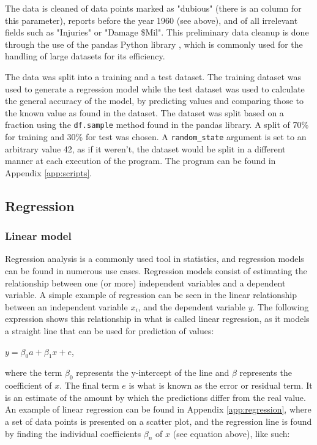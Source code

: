 \documentclass[11pt,letterpaper]{article}
\begin{document}
The data is cleaned of data points marked as "dubious" (there is an column for this parameter), reports before the year 1960 (see above), and of all irrelevant fields such as "Injuries" or "Damage \$Mil". This preliminary data cleanup is done through the use of the pandas Python library \cite{reback2020pandas}\cite{mckinney-proc-scipy-2010}, which is commonly used for the handling of large datasets for its efficiency.

The data was split into a training and a test dataset. The training dataset was used to generate a regression model while the test dataset was used to calculate the general accuracy of the model, by predicting values and comparing those to the known value as found in the dataset. The dataset was split based on a fraction using the \verb|df.sample| method found in the pandas library. A split of 70\% for training and 30\% for test was chosen. A \verb|random_state| argument is set to an arbitrary value 42, as if it weren't, the dataset would be split in a different manner at each execution of the program. The program can be found in Appendix \ref{app:scripts}.

\subsection{Regression}

\subsubsection{Linear model}

Regression analysis is a commonly used tool in statistics, and regression models can be found in numerous use cases. Regression models consist of estimating the relationship between one (or more) independent variables and a dependent variable. A simple example of regression can be seen in the linear relationship between an independent variable $x_{i}$, and the dependent variable $y$. The following expression shows this relationship in what is called linear regression, as it models a straight line that can be used for prediction of values:

$y =  \beta_0 a + \beta_1 x + e $,

where the term $\beta_0$ represents the y-intercept of the line and $\beta$ represents the coefficient of $x$. The final term $e$ is what is known as the error or residual term. It is an estimate of the amount by which the predictions differ from the real value. An example of linear regression can be found in Appendix \ref{app:regression}, where a set of data points is presented on a scatter plot, and the regression line is found by finding the individual coefficients $\beta_n$ of $x$ (see equation above), like such:
\end{document}
